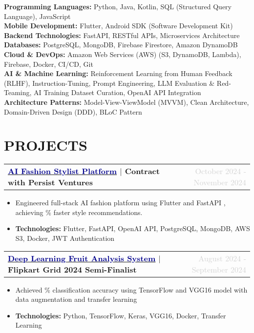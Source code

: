 \documentclass[10pt, a4paper]{article}
\makeatletter
\newcommand{\uhref}[2]{\href{#1}{\underline{\textcolor{darkblue}{#2}}}}
\DeclareRobustCommand{\semibold}[1]{%
  {\fontseries{sbc}\selectfont #1}%
}
\newcommand{\resumeProjectHeading}[2]{
  \vspace{4pt}  %
  \noindent
  \begin{tabular*}{\textwidth}[t]{@{}l@{\extracolsep{\fill}}r@{}}
    \textbf{#1} & \textcolor{lightgray}{\small #2} \\
  \end{tabular*}
  \vspace{-12pt}
}
\makeatother
\begin{document}
\textbf{Programming Languages:} Python, Java, Kotlin, SQL (Structured Query Language), JavaScript \\[3pt]
\textbf{Mobile Development:} Flutter, Android SDK (Software Development Kit) \\[3pt]
\textbf{Backend Technologies:} FastAPI, RESTful APIs, Microservices Architecture \\[3pt]
\textbf{Databases:} PostgreSQL, MongoDB, Firebase Firestore, Amazon DynamoDB \\[3pt]
\textbf{Cloud \& DevOps:} Amazon Web Services (AWS) (S3, DynamoDB, Lambda), Firebase, Docker, CI/CD, Git \\[3pt]
\textbf{AI \& Machine Learning:} Reinforcement Learning from Human Feedback (RLHF), Instruction-Tuning, Prompt Engineering, LLM Evaluation \& Red-Teaming, AI Training Dataset Curation, OpenAI API Integration \\[3pt]
\textbf{Architecture Patterns:} Model-View-ViewModel (MVVM), Clean Architecture, Domain-Driven Design (DDD), BLoC Pattern

\vspace{-6pt}

\section{PROJECTS}

\vspace{-4pt}
\resumeProjectHeading
{\uhref{https://github.com/harshsingh-io/lulu_stylist_app}{AI Fashion Stylist Platform} $|$ Contract with Persist Ventures}
{October 2024 - November 2024}
\begin{itemize}
    \item Engineered full-stack AI fashion platform using \semibold{Flutter} and \semibold{FastAPI}, achieving \semibold{40\% faster} style recommendations.
    \item \textbf{Technologies:} Flutter, FastAPI, OpenAI API, PostgreSQL, MongoDB, AWS S3, Docker, JWT Authentication
\end{itemize}

\resumeProjectHeading
{\uhref{https://github.com/harshsingh-io/fruit_freshness_analysis}{Deep Learning Fruit Analysis System} $|$ Flipkart Grid 2024 Semi-Finalist}
{August 2024 - September 2024}
\begin{itemize}
    \item Achieved \semibold{88\% classification accuracy} using TensorFlow and VGG16 model with data augmentation and transfer learning
    \item \textbf{Technologies:} Python, TensorFlow, Keras, VGG16, Docker, Transfer Learning
\end{itemize}
\end{document}
